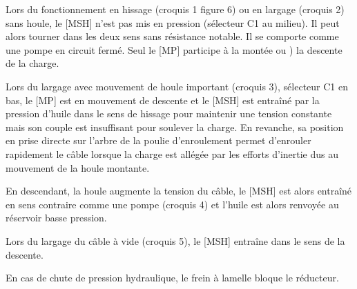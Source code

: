 \documentclass[10pt]{article}
\begin{document}
\vspace{.25cm}


\begin{minipage}[c]{.49\linewidth}
Lors du fonctionnement en hissage (croquis 1 figure 6) ou en largage (croquis 2) sans houle, le [MSH] n'est pas mis en pression (sélecteur C1 au milieu). Il peut alors tourner dans les deux sens sans résistance notable. Il se comporte comme une pompe en circuit fermé. Seul le [MP] participe à la montée ou ) la descente de la charge. 

Lors du largage avec mouvement de houle important (croquis 3), sélecteur C1 en bas, le [MP] est en mouvement de descente et le [MSH] est entraîné par la pression d'huile dans le sens de hissage pour maintenir une tension constante mais son couple est insuffisant pour soulever la charge. En revanche, sa position en prise directe sur l'arbre de la poulie d'enroulement permet d'enrouler rapidement le câble lorsque la charge est allégée par les efforts d'inertie dus au mouvement de la houle montante. 

En descendant, la houle augmente la tension du câble, le [MSH] est alors entraîné en sens contraire comme une pompe (croquis 4) et l'huile est alors renvoyée au réservoir basse pression.

Lors du largage du câble à vide (croquis 5), le [MSH] entraîne dans le sens de la descente. 

En cas de chute de pression hydraulique, le frein à lamelle bloque le réducteur. 



\end{minipage} \hfill
\end{document}
